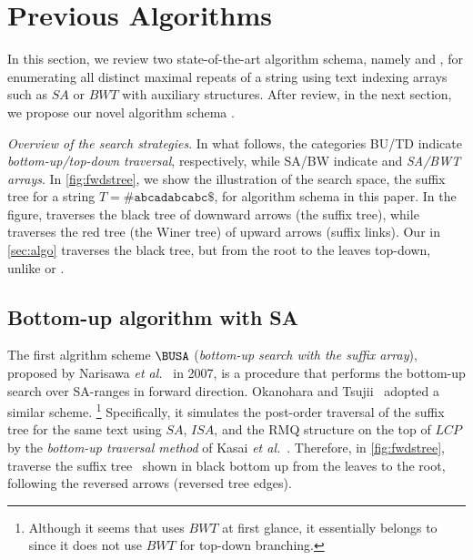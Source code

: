 \section{Previous Algorithms}
\label{sec:prev}

In this section, we review two state-of-the-art algorithm schema, namely \BUSA{} and \TDBW{}, for enumerating all distinct maximal repeats of a string using text indexing arrays such as $SA$ or $BWT$ with auxiliary structures.
After review, in the next section, we propose our novel algorithm schema \TDSA{}.


\textit{Overview of the search strategies}. In what follows, the categories \textsf{BU}/\textsf{TD} indicate \textit{bottom-up/top-down traversal}, respectively, while \textsf{SA}/\textsf{BW} indicate and \textit{SA/BWT arrays}. 
In \cref{fig:fwdstree}, we show the illustration of the search space, the suffix tree for a string $T = \mathtt{\#abcadabcabc\$}$, for algorithm schema in this paper. In the figure, \BUSA{} traverses the black tree of downward arrows (the suffix tree), while  \TDBW{} traverses the red tree (the Winer tree) of upward arrows (suffix links). Our \TDSA{} in \cref{sec:algo} traverses the black tree, but from the root to the leaves top-down, unlike \BUSA{} or \TDBW{}. 


\subsection{Bottom-up algorithm with SA}
\label{sec:prev:busa}
The first algrithm scheme $\BUSA$ (\textit{bottom-up search with the suffix array}), proposed by Narisawa \textit{et al.}~\cite{narisawa2007efficient,narisawa2017efficient} in 2007, is a procedure that performs the bottom-up search over SA-ranges in forward direction.
Okanohara and Tsujii~\cite{okanohara2009text} adopted a similar scheme.
\footnote{Although it seems that \cite{okanohara2009text} uses $BWT$ at first glance, it essentially belongs to \BUSA{} since it does not use $BWT$ for top-down branching.}
Specifically, it simulates the post-order traversal of the suffix tree for the same text using $SA$, $ISA$, and the RMQ structure on the top of $LCP$ by the \textit{bottom-up traversal method} of
Kasai \textit{et al.}~\cite{kasai:lee2001lcp:linear}.
Therefore, in \cref{fig:fwdstree}, \BUSA{} traverse the suffix tree~\cite{gusfield1997algorithms} shown in black bottom up from the leaves to the root, following the reversed arrows (reversed tree edges). 

